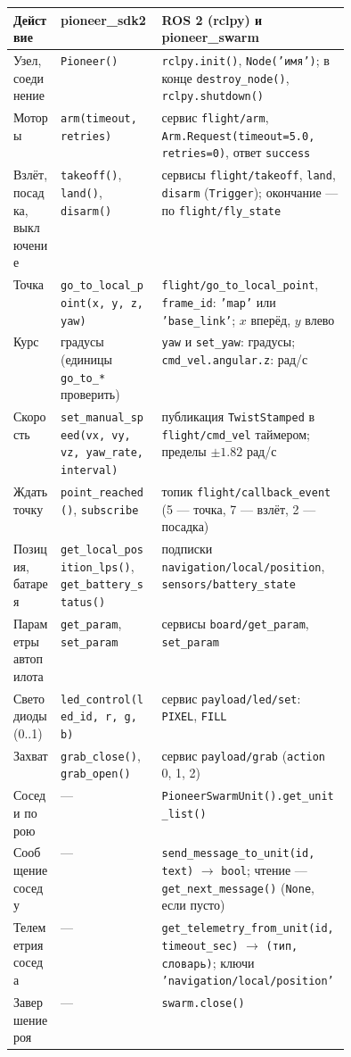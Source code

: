\begin{center}
\scriptsize
\renewcommand{\arraystretch}{1.2}
\begin{tabularx}{\linewidth}{@{}>{\raggedright\arraybackslash}p{0.14\linewidth} >{\raggedright\arraybackslash}p{0.3\linewidth} >{\raggedright\arraybackslash}X@{}}
\toprule
\textbf{Действие} & \textbf{pioneer\_sdk2} & \textbf{ROS 2 (rclpy) и pioneer\_swarm} \\
\midrule
Узел, соединение & \texttt{Pioneer()} & \texttt{rclpy.init()}, \texttt{Node('имя')}; в конце \texttt{destroy\_node()}, \texttt{rclpy.shutdown()} \\
Моторы & \texttt{arm(timeout, retries)} & сервис \texttt{flight/arm}, \texttt{Arm.Request(timeout=5.0, retries=0)}, ответ \texttt{success} \\
Взлёт, посадка, выключение & \texttt{takeoff()}, \texttt{land()}, \texttt{disarm()} & сервисы \texttt{flight/takeoff}, \texttt{land}, \texttt{disarm} (\texttt{Trigger}); окончание --- по \texttt{flight/fly\_state} \\
Точка & \texttt{go\_to\_local\_point(x, y, z, yaw)} & \texttt{flight/go\_to\_local\_point}, \texttt{frame\_id}: \texttt{'map'} или \texttt{'base\_link'}; $x$ вперёд, $y$ влево \\
Курс & градусы (единицы \texttt{go\_to\_*} проверить) & \texttt{yaw} и \texttt{set\_yaw}: градусы; \texttt{cmd\_vel.angular.z}: рад/с \\
Скорость & \texttt{set\_manual\_speed(vx, vy, vz, yaw\_rate, interval)} & публикация \texttt{TwistStamped} в \texttt{flight/cmd\_vel} таймером; пределы $\pm1.82$ рад/с \\
Ждать точку & \texttt{point\_reached()}, \texttt{subscribe} & топик \texttt{flight/callback\_event} (5 --- точка, 7 --- взлёт, 2 --- посадка) \\
Позиция, батарея & \texttt{get\_local\_position\_lps()}, \texttt{get\_battery\_status()} & подписки \texttt{navigation/local/position}, \texttt{sensors/battery\_state} \\
Параметры автопилота & \texttt{get\_param}, \texttt{set\_param} & сервисы \texttt{board/get\_param}, \texttt{set\_param} \\
Светодиоды (0..1) & \texttt{led\_control(led\_id, r, g, b)} & сервис \texttt{payload/led/set}: \texttt{PIXEL}, \texttt{FILL} \\
Захват & \texttt{grab\_close()}, \texttt{grab\_open()} & сервис \texttt{payload/grab} (\texttt{action} 0, 1, 2) \\
Соседи по рою & --- & \texttt{PioneerSwarmUnit().get\_unit\_list()} \\
Сообщение соседу & --- & \texttt{send\_message\_to\_unit(id, text)} $\to$ \texttt{bool}; чтение --- \texttt{get\_next\_message()} (\texttt{None}, если пусто) \\
Телеметрия соседа & --- & \texttt{get\_telemetry\_from\_unit(id, timeout\_sec)} $\to$ \texttt{(тип, словарь)}; ключи \texttt{'navigation/local/position'} \\
Завершение роя & --- & \texttt{swarm.close()} \\
\bottomrule
\end{tabularx}
\end{center}

